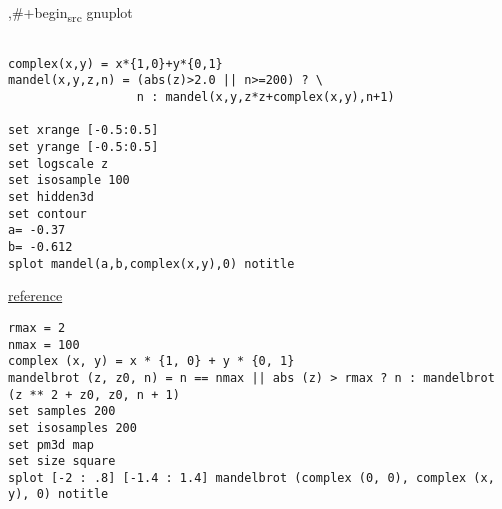 \documentclass[11pt]{article}
\begin{document}
,\#+begin\textsubscript{src} gnuplot
\begin{verbatim}

complex(x,y) = x*{1,0}+y*{0,1}
mandel(x,y,z,n) = (abs(z)>2.0 || n>=200) ? \
                  n : mandel(x,y,z*z+complex(x,y),n+1)

set xrange [-0.5:0.5]
set yrange [-0.5:0.5]
set logscale z
set isosample 100
set hidden3d
set contour
a= -0.37
b= -0.612
splot mandel(a,b,complex(x,y),0) notitle
\end{verbatim}

\begin{center}

\end{center}




\href{https://rosettacode.org/wiki/Mandelbrot\_set\#Python}{reference}


\begin{verbatim}
rmax = 2
nmax = 100
complex (x, y) = x * {1, 0} + y * {0, 1}
mandelbrot (z, z0, n) = n == nmax || abs (z) > rmax ? n : mandelbrot (z ** 2 + z0, z0, n + 1)
set samples 200
set isosamples 200
set pm3d map
set size square
splot [-2 : .8] [-1.4 : 1.4] mandelbrot (complex (0, 0), complex (x, y), 0) notitle
\end{verbatim}

\begin{center}

\end{center}
\end{document}
